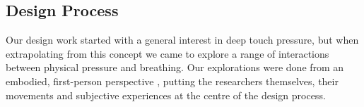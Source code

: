 

\subsection{Design Process}
\label{subsec:chi_soma_design_process}


Our design work started with a general interest in deep touch pressure, but when extrapolating from this concept we came to explore a range of interactions between physical pressure and breathing. Our explorations were done from an embodied, first-person perspective \cite{hook_embracing_2018}, putting the researchers themselves, their movements and subjective experiences at the centre of the design process.

